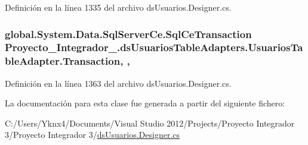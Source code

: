 Definición en la línea 1335 del archivo ds\-Usuarios.\-Designer.\-cs.

\hypertarget{class_proyecto___integrador__3_1_1ds_usuarios_table_adapters_1_1_usuarios_table_adapter_ace60df28b07f0149183cf344d90398f9}{
\subsubsection[{Transaction}]{\setlength{\rightskip}{0pt plus 5cm}global.\-System.\-Data.\-Sql\-Server\-Ce.\-Sql\-Ce\-Transaction Proyecto\-\_\-\-Integrador\-\_.\-ds\-Usuarios\-Table\-Adapters.\-Usuarios\-Table\-Adapter.\-Transaction\hspace{0.3cm}{\ttfamily [get]}, {\ttfamily [set]}, {\ttfamily [package]}}}\label{class_proyecto___integrador__3_1_1ds_usuarios_table_adapters_1_1_usuarios_table_adapter_ace60df28b07f0149183cf344d90398f9}


Definición en la línea 1363 del archivo ds\-Usuarios.\-Designer.\-cs.



La documentación para esta clase fue generada a partir del siguiente fichero\-:\begin{DoxyCompactItemize}
\item 
C\-:/\-Users/\-Yknx4/\-Documents/\-Visual Studio 2012/\-Projects/\-Proyecto Integrador 3/\-Proyecto Integrador 3/\hyperlink{ds_usuarios_8_designer_8cs}{ds\-Usuarios.\-Designer.\-cs}\end{DoxyCompactItemize}
